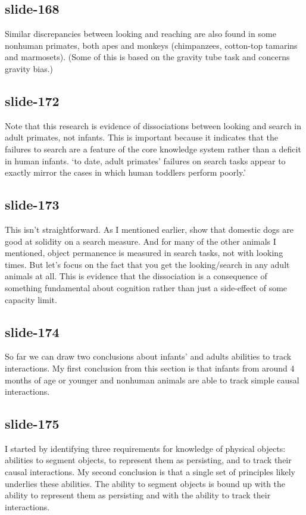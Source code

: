 \documentclass[12pt,\papersize]{extarticle}
\begin{document}
 
\subsection{slide-168}
Similar discrepancies between looking and reaching are also found in some nonhuman primates,
both apes and monkeys (chimpanzees, cotton-top tamarins and marmosets).
(Some of this is based on the gravity tube task and concerns gravity bias.)
 
 
\subsection{slide-172}
Note that this research is evidence of dissociations between looking and search in adult primates, not infants.
This is important because it indicates that the failures to search are a feature of the core knowledge system rather than a deficit in human infants.
‘to date, adult primates’ failures on search tasks appear to exactly mirror the cases in which human toddlers perform poorly.’
\citep[p.\ 17]{santos:2009_object}
 
 
\subsection{slide-173}
This isn't straightforward.
As I mentioned earlier, \citep{kundey:2010_domesticated} show that domestic dogs are good at solidity on a search measure.
And for many of the other animals I mentioned, object permanence is measured in search tasks, not with looking times.
But let's focus on the fact that you get the looking/search in any adult animals at all.
This is evidence that the dissociation is a consequence of something fundamental about cognition rather than just a side-effect of some capacity limit.
 
 
\subsection{slide-174}
So far we can draw two conclusions about infants' and adults abilities to track interactions.
My first conclusion from this section is that infants from around 4 months of age or younger and nonhuman animals are able to track simple causal interactions.
 
 
\subsection{slide-175}
I started by identifying three requirements for knowledge of physical objects: abilities to segment objects, to represent them as persisting, and to track their causal interactions.
My second conclusion is that a single set of principles likely underlies these abilities.
The ability to segment objects is bound up with the ability to represent them as persisting and with the ability to track their interactions.
 
\end{document}
